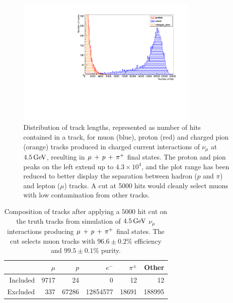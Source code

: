 \begin{figure}
\centering
\includegraphics[angle=-90,width=0.8\textwidth]{chapters/particleid_images/tracks-ccpi-4500MeV}
\caption[Track length distribution for $\mu$, $p$ and $\pi^+$ from $4.5\GeV$ neutrinos (\acs{CCPi})]{\label{fig:ccpi-track-lengths-4500MeV}Distribution of track lengths, represented as number of hits contained in a track, for muon (blue), proton (red) and charged pion (orange) tracks produced in charged current interactions of $\nu_\mu$ at $4.5\GeV$, resulting in $\mu\,+\,p\,+\,\pi^{+}$ final states. The proton and pion peaks on the left extend up to $4.3\times10^4$, and the plot range has been reduced to better display the separation between hadron ($p$ and $\pi$) and lepton ($\mu$) tracks. A cut at 5000 hits would cleanly select muons with low contamination from other tracks.}
\end{figure}

\begin{table}
\centering
\begin{tabular}{*{6}{r}}
 & $\mu$ & $p$ & $e^-$ & $\pi^\pm$ & Other \\
\hline
\hline
Included & 9717 & 24 & 0 & 12 & 12 \\
Excluded & 337 & 67286 & 12854577 & 18691 & 188995 \\
\hline
\end{tabular}
\caption[Composition of tracks after $5000$ hit cut on $4.5\GeV$ \acs{CCPi} events]{\label{table:cut-results-ccpi-4.5}Composition of tracks after applying a $5000$ hit cut on the truth tracks from simulation of $4.5\GeV$ $\nu_\mu$ interactions producing $\mu\,+\,p\,+\,\pi^{+}$ final states. The cut selects muon tracks with $96.6\pm0.2\%$ efficiency and $99.5\pm0.1\%$ purity.}
\end{table}

\clearpage
